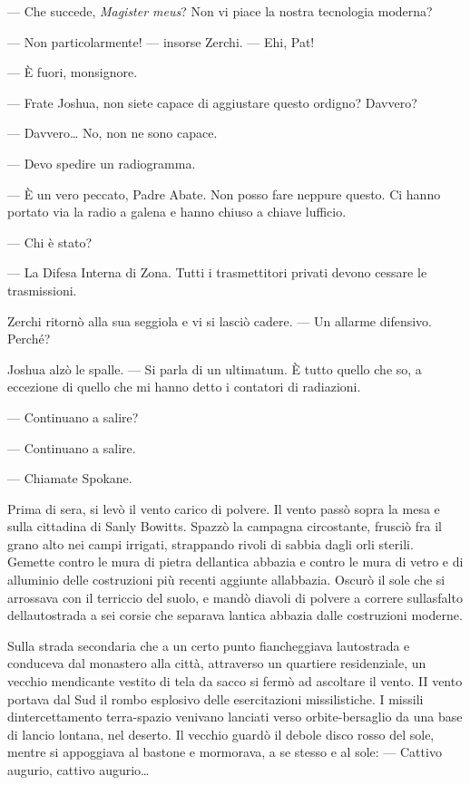 	--- Che succede, \emph{Magister meus}? Non vi piace la nostra tecnologia
	moderna?
	
	--- Non particolarmente! --- insorse Zerchi. --- Ehi, Pat!
	
	--- È fuori, monsignore.
	
	--- Frate Joshua, non siete capace di aggiustare questo ordigno?
	Davvero?
	
	--- Davvero\ldots{} No, non ne sono capace.
	
	--- Devo spedire un radiogramma.
	
	--- È un vero peccato, Padre Abate. Non posso fare neppure questo. Ci
	hanno portato via la radio a galena e hanno chiuso a chiave
	l\textquotesingle ufficio.
	
	--- Chi è stato?
	
	--- La Difesa Interna di Zona. Tutti i trasmettitori privati devono
	cessare le trasmissioni.
	
	Zerchi ritornò alla sua seggiola e vi si lasciò cadere. --- Un allarme
	difensivo. Perché?
	
	Joshua alzò le spalle. --- Si parla di un ultimatum. È tutto quello che
	so, a eccezione di quello che mi hanno detto i contatori di radiazioni.
	
	--- Continuano a salire?
	
	--- Continuano a salire.
	
	--- Chiamate Spokane.
	
	Prima di sera, si levò il vento carico di polvere. Il vento passò sopra
	la mesa e sulla cittadina di Sanly Bowitts. Spazzò la campagna
	circostante, frusciò fra il grano alto nei campi irrigati, strappando
	rivoli di sabbia dagli orli sterili. Gemette contro le mura di pietra
	dell\textquotesingle antica abbazia e contro le mura di vetro e di
	alluminio delle costruzioni più recenti aggiunte
	all\textquotesingle abbazia. Oscurò il sole che si arrossava con il
	terriccio del suolo, e mandò diavoli di polvere a correre
	sull\textquotesingle asfalto dell\textquotesingle autostrada a sei
	corsie che separava l\textquotesingle antica abbazia dalle costruzioni
	moderne.
	
	Sulla strada secondaria che a un certo punto fiancheggiava
	l\textquotesingle autostrada e conduceva dal monastero alla città,
	attraverso un quartiere residenziale, un vecchio mendicante vestito di
	tela da sacco si fermò ad ascoltare il vento. II vento portava dal Sud
	il rombo esplosivo delle esercitazioni missilistiche. I missili
	d\textquotesingle intercettamento terra-spazio venivano lanciati verso
	orbite-bersaglio da una base di lancio lontana, nel deserto. Il vecchio
	guardò il debole disco rosso del sole, mentre si appoggiava al bastone e
	mormorava, a se stesso e al sole: --- Cattivo augurio, cattivo
	augurio\ldots{}
	
